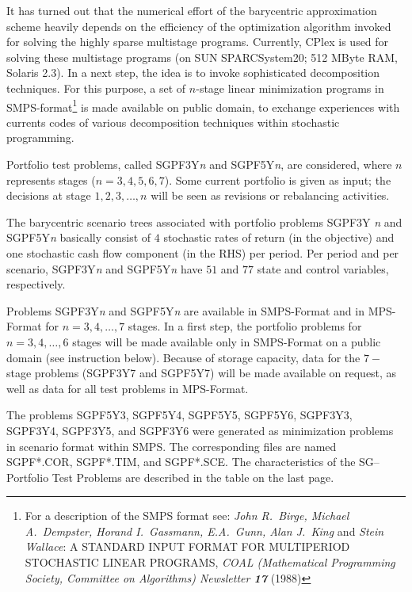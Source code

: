 \medskip
It has turned out that the numerical effort of the barycentric
approximation scheme heavily depends on the efficiency of the optimization
algorithm invoked for solving the highly sparse multistage programs. 
Currently, CPlex is used for solving these 
multistage programs (on SUN SPARCSystem20; 512 MByte RAM, Solaris 2.3).
In a next step, the idea is to invoke sophisticated decomposition 
techniques. For this purpose, a set of $n$-stage linear minimization
programs in SMPS-format\footnote{For a description of the SMPS format see: {\sl John R.\ Birge, Michael A.\ Dempster, Horand I.\ Gassmann, E.A.\ Gunn, Alan J.\ King} and {\sl Stein Wallace}: A STANDARD INPUT FORMAT FOR MULTIPERIOD STOCHASTIC LINEAR PROGRAMS, {\sl COAL (Mathematical Programming Society, Committee on Algorithms) Newsletter {\bf 17}} (1988)}
 is made available on public domain, 
to exchange experiences with currents codes 
of various decomposition techniques within stochastic programming. 

\medskip
Portfolio test problems, called SGPF3Y{\em n} 
and SGPF5Y{\em n}, are considered,
where $n$ represents stages ($n=3,4,5,6,7$).
Some current portfolio is given as input; 
the decisions at stage $1,2,3, \ldots, n$ will be seen 
as revisions or rebalancing activities. 

\medskip
The barycentric scenario trees associated with portfolio problems 
SGPF3Y {\em n} and SGPF5Y{\em n} basically consist of $4$ 
stochastic rates of 
return (in the objective) and one stochastic cash flow component
(in the RHS) per period. Per period and per scenario, 
SGPF3Y{\em n} and SGPF5Y{\em n} have $51$ and $77$ 
state and control variables, respectively.

\medskip
Problems SGPF3Y{\em n} and SGPF5Y{\em n} are available in SMPS-Format and
in MPS-Format for $n=3, 4, \ldots, 7$ stages. In a first step, the
portfolio problems for $n=3, 4, \ldots, 6$ stages will be made 
available only in SMPS-Format on a public domain (see instruction below). 
Because of storage capacity, 
data for the $7-$stage problems (SGPF3Y7 and SGPF5Y7) will be made 
available on request, as well as data for all test problems in MPS-Format. 

The problems SGPF5Y3, SGPF5Y4,
SGPF5Y5, SGPF5Y6, SGPF3Y3, SGPF3Y4, SGPF3Y5, and SGPF3Y6 were generated as minimization problems in scenario format within SMPS.
The corresponding files are named SGPF*.COR, SGPF*.TIM, and SGPF*.SCE. 
The characteristics of the SG--Portfolio Test Problems are described in the table on the last page. 

